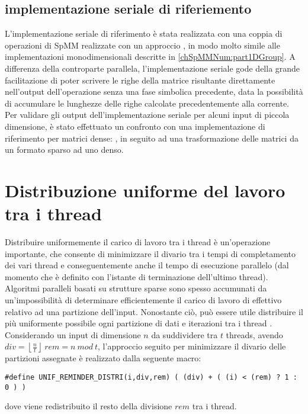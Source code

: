 \subsection{implementazione seriale di riferiemento}	\label{implSerialeRiferimento}
L'implementazione seriale di riferimento è stata realizzata con una coppia di operazioni di SpMM
realizzate con un approccio \rowbyrow, in modo molto simile alle implementazioni monodimensionali descritte in \ref{chSpMMNum:part1DGroup}.
A differenza della controparte parallela, l'implementazione seriale gode della grande facilitazione 
di poter scrivere le righe della matrice risultante direttamente nell'output dell'operazione senza una fase simbolica precedente,
data la possibilità di accumulare le lunghezze delle righe calcolate precedentemente alla corrente.\\
\voidLine
Per validare gli output dell'implementazione seriale per alcuni input di piccola dimensione,
è stato effettuato un confronto con una implementazione di riferimento per matrici dense:  \cite{CBLAS},
in seguito ad una trasformazione delle matrici da un formato sparso ad uno denso.\\

\section{Distribuzione uniforme del lavoro tra i thread}	\label{chSpMMAux:UNIF_REMINDER_DISTRI}
Distribuire uniformemente il carico di lavoro tra i thread è un'operazione importante,
che consente di minimizzare il divario tra i tempi di completamento dei vari thread 
e conseguentemente anche il tempo di esecuzione parallelo
(dal momento che è definito con l'istante di terminazione dell'ultimo thread).\\

Algoritmi paralleli basati su strutture sparse sono spesso accumunati da 
un'impossibilità di determinare efficientemente il carico di lavoro di effettivo
relativo ad una partizione dell'input.
Nonostante ciò, può essere utile distribuire il più uniformente possibile ogni partizione 
di dati e iterazioni tra i thread .\\%
Considerando un input di dimensione $n$ da suddividere tra $t$ threads, avendo 
$div=\left\lfloor \frac{n}{t}  \right\rfloor ~ rem=n ~mod ~t$,
l'approccio seguito per minimizzare il divario delle partizioni assegnate %
è realizzato dalla seguente macro:
\begin{lstlisting}
#define UNIF_REMINDER_DISTRI(i,div,rem)	( (div) + ( (i) < (rem) ? 1 : 0 ) )
\end{lstlisting}
dove viene redistribuito il resto della divisione $rem$ tra i thread.\\
